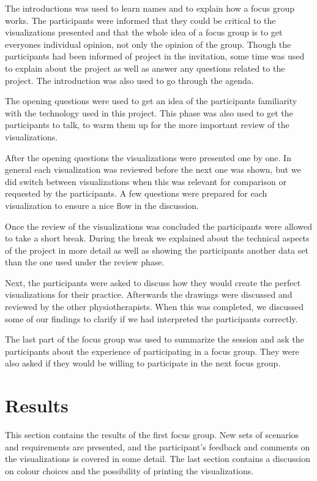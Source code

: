 The introductions was used to learn names and to explain how a focus group works. The participants were informed that they could be critical to the visualizations presented and that the whole idea of a focus group is to get everyones individual opinion, not only the opinion of the group. Though the participants had been informed of project in the invitation, some time was used to explain about the project as well as answer any questions related to the project. The introduction was also used to go through the agenda.

The opening questions were used to get an idea of the participants familiarity with the technology used in this project. This phase was also used to get the participants to talk, to warm them up for the more important review of the visualizations.

After the opening questions the visualizations were presented one by one. In general each visualization was reviewed before the next one was shown, but we did switch between visualizations when this was relevant for comparison or requested by the participants. A few questions were prepared for each visualization to ensure a nice flow in the discussion.

Once the review of the visualizations was concluded the participants were allowed to take a short break. During the break we explained about the technical aspects of the project in more detail as well as showing the participants another data set than the one used under the review phase. %

Next, the participants were asked to discuss how they would create the perfect visualizations for their practice. Afterwards the drawings were discussed and reviewed by the other physiotherapists. When this was completed, we discussed some of our findings to clarify if we had interpreted the participants correctly.

The last part of the focus group was used to summarize the session and ask the participants about the experience of participating in a focus group. They were also asked if they would be willing to participate in the next focus group.

\section{Results}
This section contains the results of the first focus group. New sets of scenarios and requirements are presented, and the participant's feedback and comments on the visualizations is covered in some detail. The last section contains a discussion on colour choices and the possibility of printing the visualizations.


